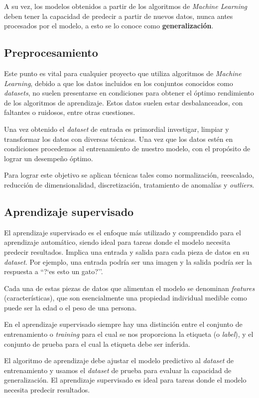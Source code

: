 \documentclass[a4paper,12pt]{article}
\begin{document}
A su vez, los modelos obtenidos a partir de los algoritmos de \textit{Machine Learning} deben tener la capacidad de predecir a partir de nuevos datos, nunca antes procesados por el modelo, a esto se lo conoce como \textbf{generalización}. 

\subsection{Preprocesamiento} \label{preprocessing}
Este punto es vital para cualquier proyecto que utiliza algoritmos de \textit{Machine Learning}, debido a que los datos incluidos en los conjuntos conocidos como \textit{datasets}, no suelen presentarse en condiciones para obtener el óptimo rendimiento de los algoritmos de aprendizaje. Estos datos suelen estar desbalanceados, con faltantes o ruidosos, entre otras cuestiones. 

Una vez obtenido el \textit{dataset} de entrada es primordial investigar, limpiar y transformar los datos con diversas técnicas. Una vez que los datos estén en condiciones procedemos al entrenamiento de nuestro modelo, con el propósito de lograr un desempeño óptimo.

Para lograr este objetivo se aplican técnicas tales como normalización, reescalado, reducción de dimensionalidad, discretización, tratamiento de anomalías y \textit{outliers}.

\subsection{Aprendizaje supervisado} \label{supervised}
El aprendizaje supervisado es el enfoque más utilizado y comprendido para el aprendizaje automático, siendo ideal para tareas donde el modelo necesita predecir resultados. Implica una entrada y salida para cada pieza de datos en su \textit{dataset}. Por ejemplo, una entrada podría ser una imagen y la salida podría ser la respuesta a ``?`es esto un gato?''.

Cada una de estas piezas de datos que alimentan el modelo se denominan \textit{features} (características), que son esencialmente una propiedad individual medible como puede ser la edad o el peso de una persona.

En el aprendizaje supervisado siempre hay una distinción entre el conjunto de entrenamiento o \textit{training} para el cual se nos proporciona la etiqueta (o \textit{label}), y el conjunto de prueba para el cual la etiqueta debe ser inferida. 

El algoritmo de aprendizaje debe ajustar el modelo predictivo al \textit{dataset} de entrenamiento y usamos el \textit{dataset} de prueba para evaluar la capacidad de generalización. El aprendizaje supervisado es ideal para tareas donde el modelo necesita predecir resultados.
\end{document}
